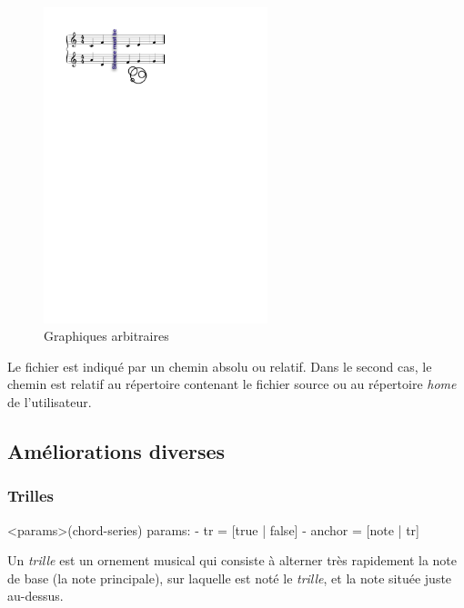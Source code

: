 \documentclass{article}
\newenvironment{gmncode}	{\vspace{-2mm}\small\verbatim}{\endverbatim\vspace{-2mm}}
\begin{document}
\begin{figure}[h]
\centering
\includegraphics[width=65mm]{img/partitions/symbol.pdf}
\caption{Graphiques arbitraires}
\label{fig:symbol}
\end{figure}

Le fichier est indiqué par un chemin absolu ou relatif. Dans le second cas, le chemin est relatif au répertoire contenant le fichier source ou au répertoire \emph{home} de l'utilisateur.



\subsection{Améliorations diverses}\label{subsec:amelioraions}


\subsubsection{Trilles}\label{subsubsec:trilles}


\begin{gmncode}
  \trill<params>(chord-series)
   params:
    - tr = [true | false]
    - anchor = [note | tr]
\end{gmncode}

Un \emph{trille} est \og{}un ornement musical qui consiste à alterner très rapidement la note de base (la note principale), sur laquelle est noté le \emph{trille}, et la note située juste au-dessus\fg{}.
\end{document}
